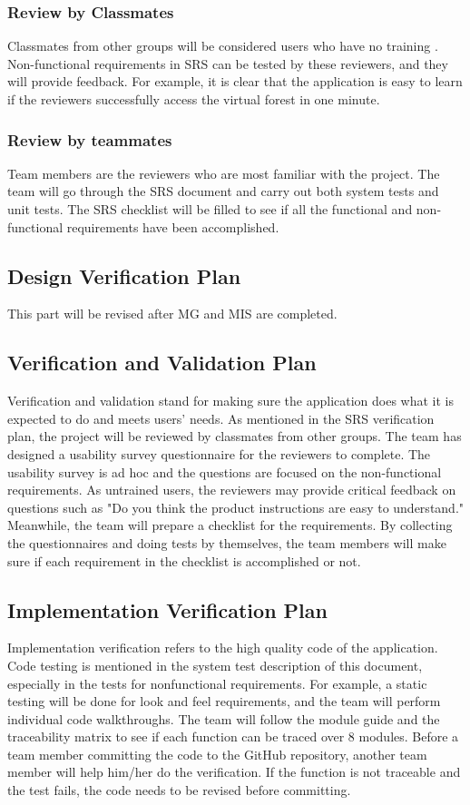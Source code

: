 \documentclass[12pt, titlepage]{article}
\begin{document}
\subsubsection{Review by Classmates}
Classmates from other groups will be considered users who have no training
. Non-functional requirements in SRS can be tested by these reviewers, and
they will provide feedback. For example, it is clear that the application is
easy to learn if the reviewers successfully access the virtual forest in one minute.

\subsubsection{Review by teammates}
Team members are the reviewers who are most familiar with the project. The team will
go through the SRS document and carry out both system tests and unit tests. The SRS
checklist will be filled to see if all the functional and non-functional requirements
have been accomplished.

\subsection{Design Verification Plan}
This part will be revised after MG and MIS are completed.

\subsection{Verification and Validation Plan}
Verification and validation stand for making sure the application does what it is
expected to do and meets users' needs. As mentioned in the SRS verification plan, the
project will be reviewed by classmates from other groups. The team has designed a
usability survey questionnaire for the reviewers to complete. The usability survey
is ad hoc
and the questions are focused on the non-functional requirements. As untrained users,
the reviewers may provide critical feedback on questions such as "Do you think the
product instructions are easy to understand." Meanwhile, the team will prepare a
checklist for the requirements. By collecting the questionnaires and doing tests by
themselves, the team members will make sure if each requirement in the checklist is
accomplished or not.

\subsection{Implementation Verification Plan}
Implementation verification refers to the high quality code of the application. Code
testing is mentioned in the system test description of this document, especially in
the tests for nonfunctional requirements. For example, a static testing will be done
for look and feel requirements, and the team will perform individual code
walkthroughs. The team will follow the module guide and the traceability matrix to see
if each function can be traced over 8 modules. Before a team member committing the
code to the GitHub repository, another team member will help him/her do the
verification.
If the function is not traceable and the test fails, the code needs to be revised
before committing.
\end{document}
